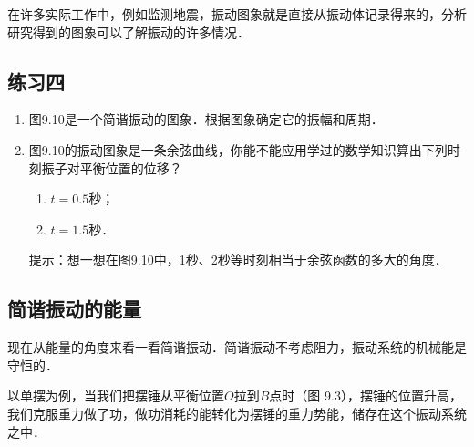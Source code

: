 在许多实际工作中，例如监测地震，振动图象就是直接从振动体记录得来的，分析研究得到的图象可以了解振动的许多情况．


\subsection*{练习四}
\begin{figure}\centering
    \caption{}
\end{figure}

\begin{enumerate}
    \item 图9.10是一个简谐振动的图象．根据图象确定它的振幅和周期．
    \item 图9.10的振动图象是一条余弦曲线，你能不能应用学过的数学知识算出下列时刻振子对平衡位置的位移？
    \begin{enumerate}
        \item $t=0.5$秒；
        \item $t=1.5$秒．
    \end{enumerate}

    提示：想一想在图9.10中，1秒、2秒等时刻相当于余弦函数的多大的角度．

\end{enumerate}

\subsection{简谐振动的能量}

现在从能量的角度来看一看简谐振动．简谐振动不考虑阻力，振动系统的机械能是守恒的．

以单摆为例，当我们把摆锤从平衡位置$O$拉到$B$点时（图
9.3），摆锤的位置升高，我们克服重力做了功，做功消耗的能转化为摆锤的重力势能，储存在这个振动系统之中．

